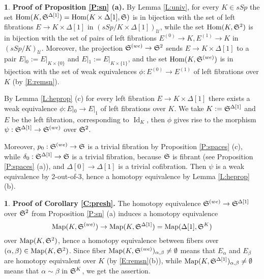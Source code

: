 \documentclass[12pt]{amsart}
\theoremstyle{plain}
\theoremstyle{definition}
\newtheorem{Emp}[Thm]{}
\numberwithin{equation}{section}
\newcommand{\cal}[1]{\mathcal{#1}}
\newcommand{\C}[1]{\cal#1}
\newcommand{\dt}{\delta}
\newcommand{\Dt}{\Delta}
\newcommand{\al}{\alpha}
\newcommand{\rl}[1]{Lemma \ref{L:#1}}
\newcommand{\rp}[1]{Proposition \ref{P:#1}}
\newcommand{\re}[1]{\ref{E:#1}}
\newcommand{\rco}[1]{Corollary \ref{C:#1}}
\newcommand{\Map}{\operatorname{Map}}
\newcommand{\Id}{\operatorname{Id}}
\newcommand{\Hom}{\operatorname{Hom}}
\renewcommand{\S}{\frak{S}}
\begin{document}
\begin{Emp} \label{E:pfsna}
{\bf Proof of \rp{sn} (a).} By \rl{univ}, for every $K\in sSp$ the
set $\Hom(K, \S^{\Dt[1]})= \Hom(K\times\Dt[1], \S)$ is in
bijection with the set of left fibrations $E\to K\times\Dt[1]$ in
$(sSp/K\times\Dt[1])_{\C{U}}$, while the set $\Hom(K, \S^2)$ is in
bijection with the set of pairs of left fibrations $E^{(0)}\to
K,E^{(1)}\to K$ in $(sSp/K)_{\C{U}}$. Moreover, the projection
$\S^{(we)}\to\S^2$ sends $E\to K\times\Dt[1]$ to a pair
$E|_0:=E|_{K\times\{0\}}$ and $E|_1:=E|_{K\times\{1\}}$, and the
set $\Hom(K, \S^{(we)})$ is in bijection with the set of weak
equivalences $\phi:E^{(0)}\to E^{(1)}$ of left fibrations over $K$
(by \re{remsn}).

By \rl{heprop} (c) for every left fibration $E\to
K\times\Dt[1]$ there exists a weak equivalence $\phi:E|_0\to E|_1$
of left fibrations over $K$. We take $K:=\S^{\Dt[1]}$ and $E$ be
the left fibration, corresponding to $\Id_K$, then $\phi$ gives
rise to the morphism $\psi:\S^{\Dt[1]}\to \S^{(we)}$ over $\S^2$.

Moreover, $p_0:\S^{(we)}\to\S$ is a  trivial fibration by \rp{spaces}
(c), while $\dt_0:\S^{\Dt[1]}\to\S$ is a trivial fibration, because 
$\S$ is fibrant (see \rp{spaces} (a)), and $\Dt[0]\to\Dt[1]$ is
a trivial cofibration. Then $\psi$ is a weak equivalence by
2-out-of-3, hence a homotopy equivalence by \rl{heprop} (b).
\end{Emp}

\begin{Emp} \label{E:pfpresh}
{\bf Proof of \rco{presh}.} The homotopy equivalence
$\S^{(we)}\to \S^{\Dt[1]}$ over $\S^2$
from \rp{sn} (a) induces a homotopy equivalence
\[
\Map(K,\S^{(we)})\to\Map(K,\S^{\Dt[1]})=
\Map(\Dt[1],\S^K)
\]
over $\Map(K,\S^2)$, hence a homotopy equivalence
between fibers over $(\al,\beta)\in\Map(K,\S^2)$. Since
fiber $\Map(K,\S^{(we)})_{\al,\beta}\neq\emptyset$ means
that $E_{\al}$ and $E_{\beta}$ are homotopy equivalent over $K$
(by \re{remsn}(b)), while
$\Map(K,\S^{\Dt[1]})_{\al,\beta}\neq\emptyset$ means
that $\al\sim\beta$ in $\S^K$, we get the assertion.
\end{Emp}
\end{document}
